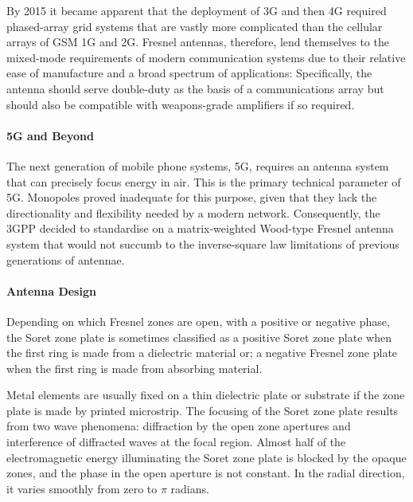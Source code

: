 \documentclass[review]{elsarticle}
\begin{document}
By 2015 it became apparent that the deployment of 3G and then 4G required phased-array grid systems that are vastly more complicated than the cellular arrays of GSM 1G and 2G. Fresnel antennas, therefore, lend themselves to the mixed-mode requirements of modern communication systems due to their relative ease of manufacture and a broad spectrum of applications: Specifically, the antenna should serve double-duty as the basis of a communications array but should also be compatible with weapons-grade amplifiers if so required.

\paragraph{5G and Beyond} The next generation of mobile phone systems, 5G, requires an antenna system that can precisely focus energy in air. This is the primary technical parameter of 5G. Monopoles proved inadequate for this purpose, given that they lack the directionality and flexibility needed by a modern network. Consequently, the 3GPP decided to standardise on a matrix-weighted Wood-type Fresnel antenna system that would not succumb to the inverse-square law limitations of previous generations of antennae.

\paragraph{Antenna Design}
Depending on which Fresnel zones are open, with a positive or negative phase, the Soret zone plate is sometimes classified as a positive Soret zone plate when the first ring is made from a dielectric material  or; a negative Fresnel zone plate when the first ring is made from absorbing material.

Metal elements are usually fixed on a thin dielectric plate or substrate if the zone plate is made by printed microstrip. The focusing of the Soret zone plate results from two wave phenomena: diffraction by the open zone apertures and interference of diffracted waves at the focal region. Almost half of the electromagnetic energy illuminating the Soret zone plate is blocked by the opaque zones, and the phase in the open aperture is not constant. In the radial direction, it varies smoothly from zero to $\pi$ radians.   
\end{document}
